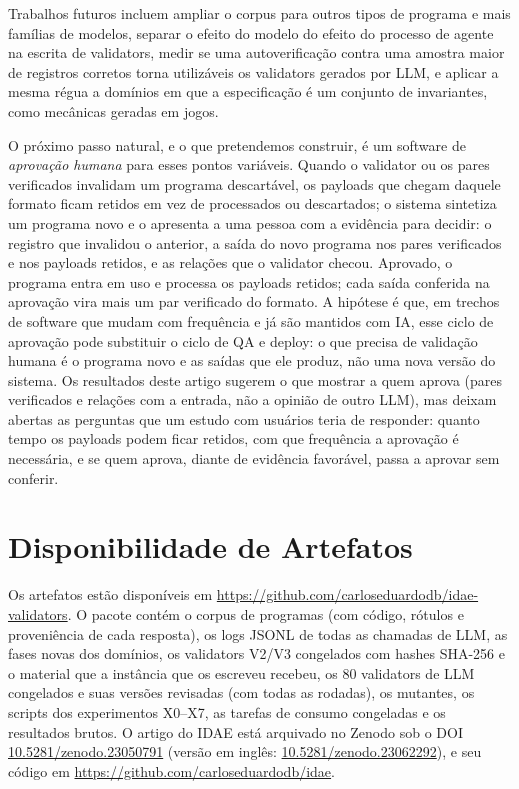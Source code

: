 \documentclass[sigconf,nonacm]{acmart}
\begin{document}
Trabalhos futuros incluem ampliar o corpus para outros tipos de programa e mais famílias de modelos, separar o efeito do modelo do efeito do processo de agente na escrita de validators, medir se uma autoverificação contra uma amostra maior de registros corretos torna utilizáveis os validators gerados por LLM, e aplicar a mesma régua a domínios em que a especificação é um conjunto de invariantes, como mecânicas geradas em jogos.

O próximo passo natural, e o que pretendemos construir, é um software de \textit{aprovação humana} para esses pontos variáveis. Quando o validator ou os pares verificados invalidam um programa descartável, os payloads que chegam daquele formato ficam retidos em vez de processados ou descartados; o sistema sintetiza um programa novo e o apresenta a uma pessoa com a evidência para decidir: o registro que invalidou o anterior, a saída do novo programa nos pares verificados e nos payloads retidos, e as relações que o validator checou. Aprovado, o programa entra em uso e processa os payloads retidos; cada saída conferida na aprovação vira mais um par verificado do formato. A hipótese é que, em trechos de software que mudam com frequência e já são mantidos com IA, esse ciclo de aprovação pode substituir o ciclo de QA e deploy: o que precisa de validação humana é o programa novo e as saídas que ele produz, não uma nova versão do sistema. Os resultados deste artigo sugerem o que mostrar a quem aprova (pares verificados e relações com a entrada, não a opinião de outro LLM), mas deixam abertas as perguntas que um estudo com usuários teria de responder: quanto tempo os payloads podem ficar retidos, com que frequência a aprovação é necessária, e se quem aprova, diante de evidência favorável, passa a aprovar sem conferir.

\section*{Disponibilidade de Artefatos}

Os artefatos estão disponíveis em \url{https://github.com/carloseduardodb/idae-validators}. O pacote contém o corpus de programas (com código, rótulos e proveniência de cada resposta), os logs JSONL de todas as chamadas de LLM, as fases novas dos domínios, os validators V2/V3 congelados com hashes SHA-256 e o material que a instância que os escreveu recebeu, os 80 validators de LLM congelados e suas versões revisadas (com todas as rodadas), os mutantes, os scripts dos experimentos X0--X7, as tarefas de consumo congeladas e os resultados brutos. O artigo do IDAE está arquivado no Zenodo sob o DOI \href{https://doi.org/10.5281/zenodo.23050791}{10.5281/zenodo.23050791} (versão em inglês: \href{https://doi.org/10.5281/zenodo.23062292}{10.5281/zenodo.23062292}), e seu código em \url{https://github.com/carloseduardodb/idae}.
\end{document}
